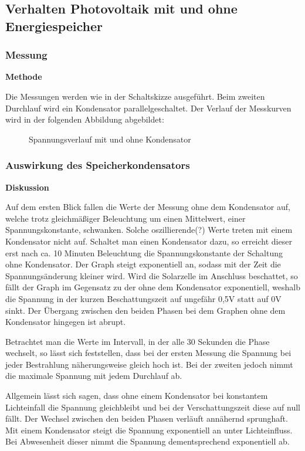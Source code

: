 \subsection {Verhalten Photovoltaik mit und ohne Energiespeicher}   %
    \subsubsection{Messung}                                             %
        \textbf{Methode}
        \newline
        \par Die Messungen werden wie in der Schaltskizze ausgeführt. Beim zweiten Durchlauf wird ein Kondensator parallelgeschaltet. Der Verlauf der Messkurven wird in der folgenden Abbildung abgebildet:
        
        \begin{figure}[H]
            \def\svgwidth{\textwidth}
               
            \caption{Spannungsverlauf mit und ohne Kondensator}
    \end{figure}
        
    \subsubsection{Auswirkung des Speicherkondensators}                 %
        \textbf{Diskussion}
        \newline
        \par Auf dem ersten Blick fallen die Werte der Messung ohne dem Kondensator auf, welche trotz gleichmäßiger Beleuchtung um einen Mittelwert, einer Spannungskonstante, schwanken. Solche oszillierende(?) Werte treten mit einem Kondensator nicht auf. Schaltet man einen Kondensator dazu, so erreicht dieser erst nach ca. 10 Minuten Beleuchtung die Spannungskonstante der Schaltung ohne Kondensator. Der Graph steigt exponentiell an, sodass mit der Zeit die Spannungsänderung kleiner wird. Wird die Solarzelle im Anschluss beschattet, so fällt der Graph im Gegensatz zu der ohne dem Kondensator exponentiell, weshalb die Spannung in der kurzen Beschattungszeit auf ungefähr 0,5V statt auf 0V sinkt. Der Übergang zwischen den beiden Phasen bei dem Graphen ohne dem Kondensator hingegen ist abrupt.
        \par Betrachtet man die Werte im Intervall, in der alle 30 Sekunden die Phase wechselt, so lässt sich feststellen, dass bei der ersten Messung die Spannung bei jeder Bestrahlung näherungsweise gleich hoch ist. Bei der zweiten jedoch nimmt die maximale Spannung mit jedem Durchlauf ab. 
        \par Allgemein lässt sich sagen, dass ohne einem Kondensator bei konstantem Lichteinfall die Spannung gleichbleibt und bei der Verschattungszeit diese auf null fällt. Der Wechsel zwischen den beiden Phasen verläuft annähernd sprunghaft. Mit einem Kondensator steigt die Spannung exponentiell an unter Lichteinfluss. Bei Abwesenheit dieser nimmt die Spannung dementsprechend exponentiell ab.
        
